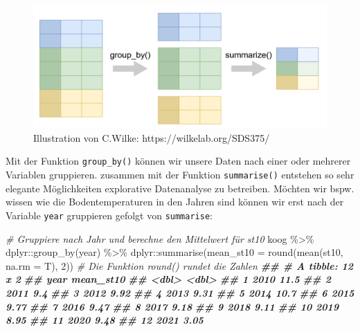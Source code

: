 \documentclass[
]{article}
\newenvironment{Shaded}{\begin{snugshade}}{\end{snugshade}}
\newcommand{\AttributeTok}[1]{\textcolor[rgb]{0.77,0.63,0.00}{#1}}
\newcommand{\CommentTok}[1]{\textcolor[rgb]{0.56,0.35,0.01}{\textit{#1}}}
\newcommand{\DecValTok}[1]{\textcolor[rgb]{0.00,0.00,0.81}{#1}}
\newcommand{\DocumentationTok}[1]{\textcolor[rgb]{0.56,0.35,0.01}{\textbf{\textit{#1}}}}
\newcommand{\FunctionTok}[1]{\textcolor[rgb]{0.00,0.00,0.00}{#1}}
\newcommand{\NormalTok}[1]{#1}
\newcommand{\SpecialCharTok}[1]{\textcolor[rgb]{0.00,0.00,0.00}{#1}}
\begin{document}
\begin{figure}

{\centering \includegraphics[width=17.83in]{images/041} 

}

\caption{Illustration von C.Wilke: https://wilkelab.org/SDS375/}\label{fig:unnamed-chunk-140}
\end{figure}

Mit der Funktion \texttt{group\_by()} können wir unsere Daten nach einer oder mehrerer Variablen gruppieren. zusammen mit der Funktion \texttt{summarise()} entstehen so sehr elegante Möglichkeiten explorative Datenanalyse zu betreiben. Möchten wir bspw. wissen wie die Bodentemperaturen in den Jahren sind können wir erst nach der Variable \texttt{year} gruppieren gefolgt von \texttt{summarise}:

\begin{Shaded}
\begin{Highlighting}[]
\CommentTok{\# Gruppiere nach Jahr und berechne den Mittelwert für st10}
\NormalTok{koog }\SpecialCharTok{\%\textgreater{}\%}
\NormalTok{  dplyr}\SpecialCharTok{::}\FunctionTok{group\_by}\NormalTok{(year) }\SpecialCharTok{\%\textgreater{}\%}
\NormalTok{  dplyr}\SpecialCharTok{::}\FunctionTok{summarise}\NormalTok{(}\AttributeTok{mean\_st10 =} \FunctionTok{round}\NormalTok{(}\FunctionTok{mean}\NormalTok{(st10, }\AttributeTok{na.rm =}\NormalTok{ T), }\DecValTok{2}\NormalTok{)) }\CommentTok{\# Die Funktion round() rundet die Zahlen}
\DocumentationTok{\#\# \# A tibble: 12 x 2}
\DocumentationTok{\#\#     year mean\_st10}
\DocumentationTok{\#\#    \textless{}dbl\textgreater{}     \textless{}dbl\textgreater{}}
\DocumentationTok{\#\#  1  2010     11.5 }
\DocumentationTok{\#\#  2  2011      9.4 }
\DocumentationTok{\#\#  3  2012      9.92}
\DocumentationTok{\#\#  4  2013      9.31}
\DocumentationTok{\#\#  5  2014     10.7 }
\DocumentationTok{\#\#  6  2015      9.77}
\DocumentationTok{\#\#  7  2016      9.47}
\DocumentationTok{\#\#  8  2017      9.18}
\DocumentationTok{\#\#  9  2018      9.11}
\DocumentationTok{\#\# 10  2019      8.95}
\DocumentationTok{\#\# 11  2020      9.48}
\DocumentationTok{\#\# 12  2021      3.05}
\end{Highlighting}
\end{Shaded}
\end{document}
